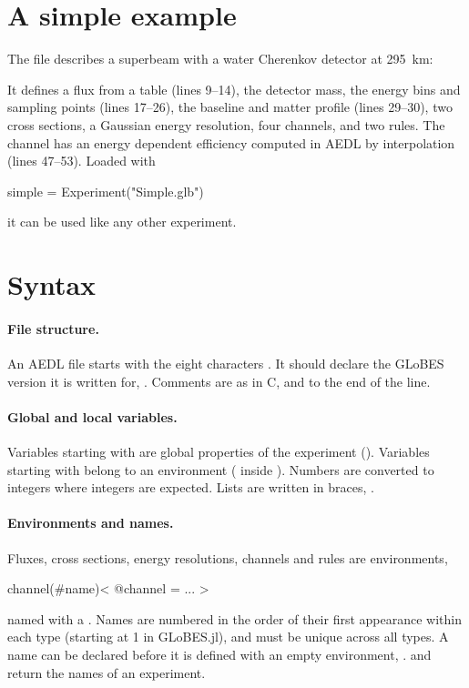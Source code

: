 \section{A simple example}

The file  describes a superbeam with a water
Cherenkov detector at 295~km:


\noindent It defines a flux from a table (lines 9--14), the detector mass, the
energy bins and sampling points (lines 17--26), the baseline and matter
profile (lines 29--30), two cross sections, a Gaussian energy resolution, four
channels, and two rules. The channel  has an energy dependent
efficiency computed in AEDL by interpolation (lines 47--53). Loaded with
\begin{julia}
simple = Experiment("Simple.glb")
\end{julia}
it can be used like any other experiment.

\section{Syntax}\label{sec:aedl-syntax}

\paragraph{File structure.} An AEDL file starts with the eight characters
. It should declare the GLoBES version it is written for,
. Comments are as in C,  and
 to the end of the line.

\paragraph{Global and local variables.} Variables starting with \code{\$} are
global properties of the experiment (). Variables
starting with  belong to an environment
( inside ). Numbers are converted to integers
where integers are expected. Lists are written in braces,
.

\paragraph{Environments and names.} Fluxes, cross sections, energy
resolutions, channels and rules are environments,
\begin{aedl}
channel(#name)<
   @channel = ...
>
\end{aedl}
named with a \code{\#}. Names are numbered in the order of their first
appearance within each type (starting at 1 in GLoBES.jl), and must be unique
across all types. A name can be declared before it is defined with an empty
environment, .  and
 return the names of an experiment.

